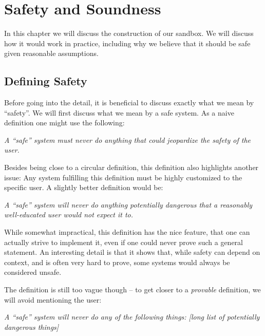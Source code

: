 \chapter{Safety and Soundness}
\label{chap:safesound}

In this chapter we will discuss the construction of our sandbox. We will discuss
how it would work in practice, including why we believe that it should be safe
given reasonable assumptions.

\section{Defining Safety}

Before going into the detail, it is beneficial to discuss exactly what we mean
by ``safety''. We will first discuss what we mean by a safe system. As a naive
definition one might use the following:

\vspace{0.3cm}
\begin{addmargin}{1cm}
  {\it A ``safe'' system must never do anything that could jeopardize the
    safety of the user.}
\end{addmargin}
\vspace{0.3cm}

Besides being close to a circular definition, this definition also highlights
another issue: Any system fulfilling this definition must be highly customized
to the specific user. A slightly better definition would be:

\vspace{0.3cm}
\begin{addmargin}{1cm}
  {\it A ``safe'' system will never do anything potentially dangerous that a
    reasonably well-educated user would not expect it to.}
\end{addmargin}
\vspace{0.3cm}

While somewhat impractical, this definition has the nice feature, that one can
actually strive to implement it, even if one could never prove such a general
statement. An interesting detail is that it shows that, while safety can depend
on context, and is often very hard to prove, some systems would always be
considered unsafe.

The definition is still too vague though -- to get closer to a \emph{provable}
definition, we will avoid mentioning the user:

\vspace{0.3cm}
\begin{addmargin}{1cm}
  {\it A ``safe'' system will never do any of the following things: [long list
    of potentially dangerous things]}
\end{addmargin}
\vspace{0.3cm}

